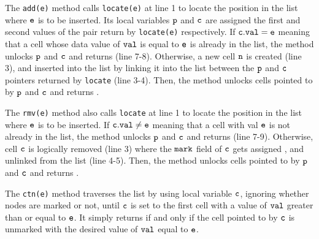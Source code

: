  


The {\tt add(e)} method calls {\tt locate(e)} at line 1 to locate the position in the list where $\tt e$ is to be inserted. Its local variables $\tt p$ and $\tt c$ are assigned the first and second values of the pair return by {\tt locate(e)} respectively. If $\tt c.val = e$ meaning that a cell whose data value of $\tt val$ is equal to $\tt e$ is already in the list, the method unlocks $\tt p$ and $\tt c$ and returns \false \; (line 7-8). Otherwise, a new cell $\tt n$ is created (line 3), and inserted into the list by linking it into the list between the $\tt p$ and $\tt c$ pointers returned by
{\tt locate} (line 3-4). Then, the method unlocks cells pointed to by $\tt p$ and $\tt c$ and returns \true.  

The {\tt rmv(e)} method also calls {\tt locate} at line 1 to locate the position in the list where $\tt e$ is to be inserted. If $\tt c.val \neq e$ meaning that a cell with val $\tt e$ is not already in the list, the method unlocks $\tt p$ and $\tt c$ and returns \false (line 7-9). Otherwise, cell $\tt c$ is logically removed (line 3) where the $\tt mark$ field of $\tt c$ gets assigned \true, and unlinked from the list (line 4-5). Then, the method unlocks cells pointed to by $\tt p$ and $\tt c$ and returns \true.  

The {\tt ctn(e)} method traverses the list by using local variable $\tt c$, ignoring whether nodes are marked or not, until $\tt c$ is set to the
first cell with a value of $\tt val$ greater than or equal to $\tt e$. It simply returns \true \; if and only if the cell pointed to by $\tt c$  is unmarked with the desired value of $\tt val$ equal to $\tt e$. 
